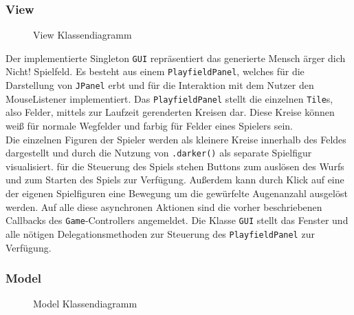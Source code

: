 \documentclass[conference]{IEEEtran}
\begin{document}
\subsubsection{View}
\begin{figure}[]
    \centering
    \caption{View Klassendiagramm}
\end{figure}

Der implementierte Singleton \texttt{GUI} repr\"asentiert das generierte Mensch \"arger dich Nicht! Spielfeld. Es besteht aus einem \texttt{PlayfieldPanel}, welches f\"ur die Darstellung von \texttt{JPanel} erbt und f\"ur die Interaktion mit dem Nutzer den MouseListener implementiert. Das \texttt{PlayfieldPanel} stellt die einzelnen \texttt{Tile}s, also Felder, mittels zur Laufzeit gerenderten Kreisen dar. Diese Kreise k\"onnen wei{\ss} f\"ur normale Wegfelder und farbig f\"ur Felder eines Spielers sein. \\
  Die einzelnen Figuren der Spieler werden als kleinere Kreise innerhalb des Feldes dargestellt und durch die Nutzung von \texttt{.darker()} als separate Spielfigur visualisiert. f\"ur die Steuerung des Spiels stehen Buttons zum ausl\"osen des Wurfs und zum Starten des Spiels zur Verf\"ugung. Au{\ss}erdem kann durch Klick auf eine der eigenen Spielfiguren eine Bewegung um die gew\"urfelte Augenanzahl ausgel\"ost werden. Auf alle diese asynchronen Aktionen sind die vorher beschriebenen Callbacks des \texttt{Game}-Controllers angemeldet. Die Klasse \texttt{GUI} stellt das Fenster und alle n\"otigen Delegationsmethoden zur Steuerung des \texttt{PlayfieldPanel} zur Verf\"ugung. \\

\subsubsection{Model}
\begin{figure}[]
    \centering
    \caption{Model Klassendiagramm}
\end{figure}
\end{document}
